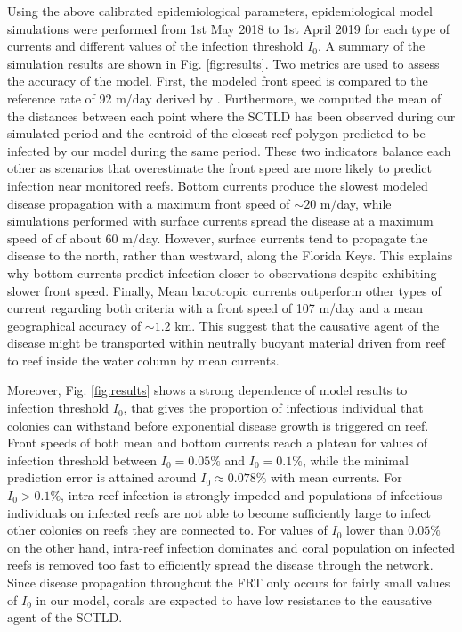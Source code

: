 \documentclass[utf8]{frontiersSCNS}
\begin{document}
Using the above calibrated epidemiological parameters, epidemiological model simulations were performed from 1st May 2018 to 1st April 2019 for each type of currents and different values of the infection threshold $I_0$. A summary of the simulation results are shown in Fig. \ref{fig:results}. Two metrics are used to assess the accuracy of the model. First, the modeled front speed is compared to the reference rate of 92 m/day derived by \cite{muller2020spatial}. Furthermore, we computed the mean of the distances between each point where the SCTLD has been observed during our simulated period and the centroid of the closest reef polygon predicted to be infected by our model during the same period. These two indicators balance each other as scenarios that overestimate the front speed are more likely to predict infection near monitored reefs. Bottom currents produce the slowest modeled disease propagation with a maximum front speed of $\sim 20$ m/day, while simulations performed with surface currents spread the disease at a maximum speed of of about 60 m/day. However, surface currents tend to propagate the disease to the north, rather than westward, along the Florida Keys. This explains why bottom currents predict infection closer to observations despite exhibiting slower front speed. Finally, Mean barotropic currents outperform other types of current regarding both criteria with a front speed of 107 m/day and a mean geographical accuracy of $\sim1.2$ km. This suggest that the causative agent of the disease might be transported within neutrally buoyant material driven from reef to reef inside the water column by mean currents.

Moreover, Fig. \ref{fig:results} shows a strong dependence of model results to infection threshold $I_0$, that gives the proportion of infectious individual that colonies can withstand before exponential disease growth is triggered on reef. Front speeds of both mean and bottom currents reach a plateau for values of infection threshold between $I_0=0.05\%$ and $I_0=0.1\%$, while the minimal prediction error is attained around $I_0 \approx 0.078\%$ with mean currents. For $I_0 > 0.1\%$, intra-reef infection is strongly impeded and populations of infectious individuals on infected reefs are not able to become sufficiently large to infect other colonies on reefs they are connected to. For values of $I_0$ lower than $0.05\%$ on the other hand, intra-reef infection dominates and coral population on infected reefs is removed too fast to efficiently spread the disease through the network. Since disease propagation throughout the FRT only occurs for fairly small values of $I_0$ in our model, corals are expected to have low resistance to the causative agent of the SCTLD. 
\end{document}
